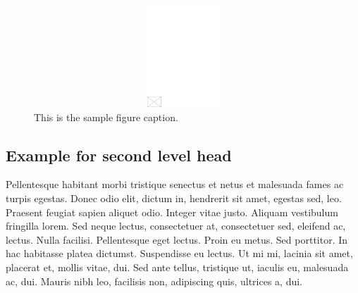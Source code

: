 \documentclass[AMS,STIX2COL]{WileyNJD-v2}
\begin{document}
    \begin{figure}
        \centerline{\includegraphics[width=342pt,height=9pc,draft]{empty}}
        \caption{This is the sample figure caption.\label{fig2}}
    \end{figure}

    \subsection{Example for second level head}

    Pellentesque habitant morbi tristique senectus et netus et malesuada fames ac turpis egestas. Donec odio elit, dictum
    in, hendrerit sit amet, egestas sed, leo. Praesent feugiat sapien aliquet odio. Integer vitae justo. Aliquam vestibulum
    fringilla lorem. Sed neque lectus, consectetuer at, consectetuer sed, eleifend ac, lectus. Nulla facilisi. Pellentesque
    eget lectus. Proin eu metus. Sed porttitor. In hac habitasse platea dictumst. Suspendisse eu lectus. Ut mi mi, lacinia
    sit amet, placerat et, mollis vitae, dui. Sed ante tellus, tristique ut, iaculis eu, malesuada ac, dui. Mauris nibh leo,
    facilisis non, adipiscing quis, ultrices a, dui.
\end{document}
